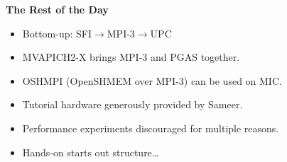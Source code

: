 \documentclass[11pt]{beamer}
\begin{document}
\begin{frame}{} \LARGE
  \begin{center}
      \textbf{The Rest of the Day}
  \end{center}
\end{frame}

\begin{frame}{} \Large
    \begin{itemize}
        \item Bottom-up: SFI$\rightarrow$MPI-3$\rightarrow$UPC
        \item MVAPICH2-X brings MPI-3 and PGAS together.
        \item OSHMPI (OpenSHMEM over MPI-3) can be used on MIC.
        \item Tutorial hardware generously provided by Sameer.
        \item Performance experiments discouraged for multiple reasons.
        \item Hands-on starts out structure\ldots
    \end{itemize}
\end{frame}
\end{document}

